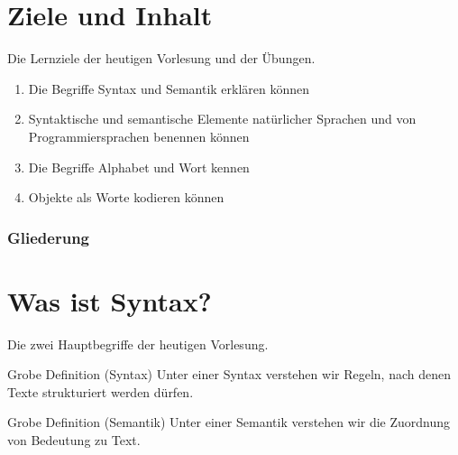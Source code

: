 %
%
%

%
%
%



\subtitle{Text und seine Bedeutung}

\date{27. Oktober 2006}




\begin{frame}
  \maketitle
\end{frame}


\section*{Ziele und Inhalt}

\begin{frame}{Die Lernziele der heutigen Vorlesung und der Übungen.} 
  \begin{enumerate}
  \item Die Begriffe Syntax und Semantik erklären können
  \item Syntaktische und semantische Elemente natürlicher Sprachen und
    von Programmiersprachen benennen können
  \item Die Begriffe Alphabet und Wort kennen
  \item Objekte als Worte kodieren können
  \end{enumerate}
\end{frame}

\begin{frame}\frametitle<presentation>{Gliederung}
  \tableofcontents
\end{frame}


\section{Was ist Syntax?}

\begin{frame}{Die zwei Hauptbegriffe der heutigen Vorlesung.}
  \begin{block}{Grobe Definition (Syntax)}
    Unter einer \alert{Syntax} verstehen wir \alert{Regeln}, nach denen
    Texte \alert{strukturiert} werden dürfen. 
  \end{block}
  \begin{block}{Grobe Definition (Semantik)}
    Unter einer \alert{Semantik} verstehen wir die Zuordnung von
    \alert{Bedeutung} zu Text.
  \end{block}
\end{frame}



